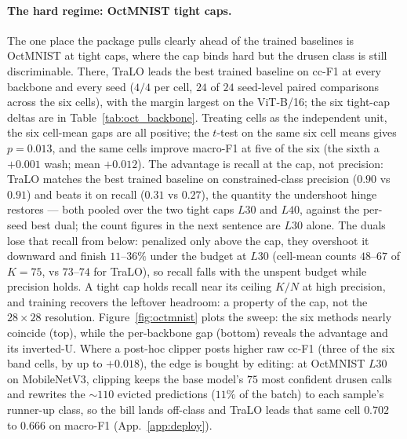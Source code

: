 \documentclass[10pt]{article}
\begin{document}
\paragraph{The hard regime: OctMNIST tight caps.}
The one place the package pulls clearly ahead of the trained baselines is
OctMNIST at tight caps, where the cap binds hard but the drusen class is
still discriminable. There, TraLO leads the best trained baseline on cc-F1
at every backbone and every seed ($4/4$ per cell, $24$ of $24$ seed-level
paired comparisons across the six cells), with the margin largest on the
ViT-B/16; the six tight-cap deltas are in Table~\ref{tab:oct_backbone}.
Treating cells as the independent unit, the six cell-mean gaps are all
positive; the $t$-test on the same six cell means gives $p{=}0.013$, and
the same cells improve macro-F1 at five of the six (the sixth a $+0.001$
wash; mean $+0.012$). The advantage is recall at the cap, not precision:
TraLO matches the best trained baseline on constrained-class precision
($0.90$ vs $0.91$) and beats it on recall ($0.31$ vs $0.27$), the quantity
the undershoot hinge restores{\color{blue} --- both pooled over the two tight
caps $L30$ and $L40$, against the per-seed best dual; the count figures in the
next sentence are $L30$ alone}. The duals lose that recall from below:
penalized only above the cap, they overshoot it downward and finish
$11$--$36\%$ under the budget at $L30$ (cell-mean counts $48$--$67$ of
$K{=}75$, vs $73$--$74$ for TraLO), so recall falls with the unspent
budget while precision holds. A tight cap holds recall near its ceiling
$K/N$ at high precision, and training recovers the leftover headroom: a
property of the cap, not the $28{\times}28$ resolution. Figure~\ref{fig:octmnist}
plots the sweep: the six methods nearly coincide (top), while the
per-backbone gap (bottom) reveals the advantage and its inverted-U. Where a
post-hoc clipper posts higher raw cc-F1 (three of the six band cells, by
up to $+0.018$), the edge is bought by editing: at OctMNIST $L30$ on
MobileNetV3, clipping keeps the base model's $75$ most confident drusen
calls and rewrites the ${\sim}110$ evicted predictions ($11\%$ of the
batch) to each sample's runner-up class, so the bill lands off-class and
TraLO leads that same cell $0.702$ to $0.666$ on macro-F1
(App.~\ref{app:deploy}).
\end{document}
